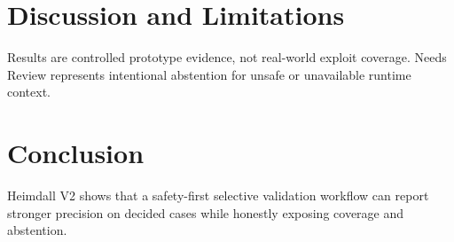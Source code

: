 \documentclass[conference]{IEEEtran}
\begin{document}
\section{Discussion and Limitations}
Results are controlled prototype evidence, not real-world exploit coverage. Needs Review represents intentional abstention for unsafe or unavailable runtime context.
\section{Conclusion}
Heimdall V2 shows that a safety-first selective validation workflow can report stronger precision on decided cases while honestly exposing coverage and abstention.


\end{document}
